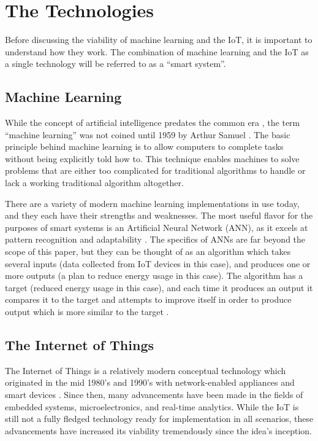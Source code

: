 \documentclass[letterpaper]{article}
\begin{document}
\section{The Technologies} \label{info}
Before discussing the viability of machine learning and the IoT, it is important to understand how they work. The combination of machine learning and the IoT as a single technology will be referred to as a ``smart system''.

\subsection{Machine Learning} \label{MLinfo}
While the concept of artificial intelligence predates the common era \cite{mccorduck04}, the term ``machine learning'' was not coined until 1959 by Arthur Samuel \cite{samuel59}. The basic principle behind machine learning is to allow computers to complete tasks without being explicitly told how to. This technique enables machines to solve problems that are either too complicated for traditional algorithms to handle or lack a working traditional algorithm altogether.\par

There are a variety of modern machine learning implementations in use today, and they each have their strengths and weaknesses. The most useful flavor for the purposes of smart systems is an Artificial Neural Network (ANN), as it excels at pattern recognition and adaptability \cite{bishop06}. The specifics of ANNs are far beyond the scope of this paper, but they can be thought of as an algorithm which takes several inputs (data collected from IoT devices in this case), and produces one or more outputs (a plan to reduce energy usage in this case). The algorithm has a target (reduced energy usage in this case), and each time it produces an output it compares it to the target and attempts to improve itself in order to produce output which is more similar to the target \cite{bonaccorso17}.

\subsection{The Internet of Things} \label{IoTinfo}
The Internet of Things is a relatively modern conceptual technology which originated in the mid 1980's and 1990's with network-enabled appliances and smart devices \cite{weiser91}. Since then, many advancements have been made in the fields of embedded systems, microelectronics, and real-time analytics. While the IoT is still not a fully fledged technology ready for implementation in all scenarios, these advancements have increased its viability tremendously since the idea's inception.\par
\end{document}
